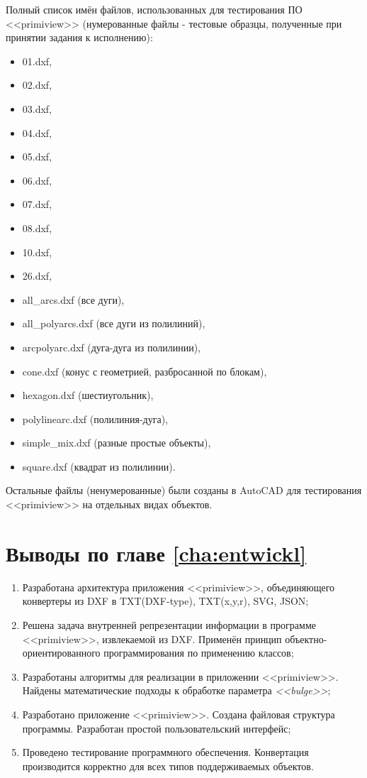 Полный список имён файлов, использованных для тестирования ПО <<primiview>> (нумерованные файлы - тестовые образцы, полученные при принятии задания к исполнению):
\begin{itemize}
	\item 01.dxf,
	\item 02.dxf,
	\item 03.dxf,
	\item 04.dxf,
	\item 05.dxf,
	\item 06.dxf,
	\item 07.dxf,
	\item 08.dxf,
	\item 10.dxf,
	\item 26.dxf,
	\item all\_arcs.dxf  (все дуги),
	\item all\_polyarcs.dxf (все дуги из полилиний),
	\item arcpolyarc.dxf (дуга-дуга из полилинии),
	\item cone.dxf (конус с геометрией, разбросанной по блокам),
	\item hexagon.dxf (шестиугольник),
	\item polylinearc.dxf (полилиния-дуга),
	\item simple\_mix.dxf (разные простые объекты),
	\item square.dxf (квадрат из полилинии).
\end{itemize}

Остальные файлы (ненумерованные) были созданы в AutoCAD для тестирования <<primiview>> на отдельных видах объектов.

\section{Выводы по главе \ref{cha:entwickl}}

\begin{enumerate}[1)]
	\item Разработана архитектура приложения <<primiview>>, объединяющего конвертеры из DXF в TXT(DXF-type), TXT(x,y,r), SVG, JSON;
	\item Решена задача внутренней репрезентации информации в программе <<primiview>>, извлекаемой из DXF. Применён принцип объектно-ориентированного программирования по применению классов;
	\item Разработаны алгоритмы для реализации в приложении <<primiview>>. Найдены математические подходы к обработке параметра \textit{<<bulge>>};
	\item Разработано приложение <<primiview>>. Создана файловая структура программы. Разработан простой пользовательский интерфейс;
	\item Проведено тестирование программного обеспечения. Конвертация производится корректно для всех типов поддерживаемых объектов.
\end{enumerate}
